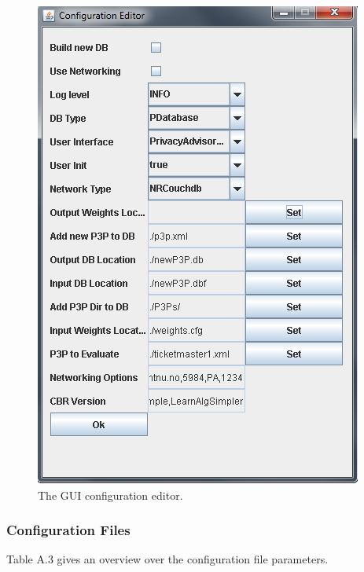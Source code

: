    \begin{figure}[h!]
     \includegraphics[width = .6\textwidth]{Documentation/gui_config.png}
     \caption{The GUI configuration editor.}
   \label{guiConfig}
 \end{figure}


\subsubsection{Configuration Files}

Table A.3 gives an overview over the configuration file parameters.

